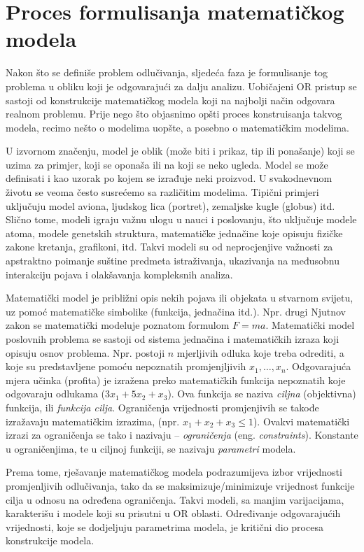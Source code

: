 \documentclass[b5paper, utf8, 11pt, colorlinks]{book}
\theoremstyle{definition}
\begin{document}
 \section{Proces formulisanja matematičkog modela}

 Nakon što se definiše problem odlučivanja, sljedeća faza je formulisanje tog problema u obliku koji je odgovarajući za dalju analizu. Uobičajeni OR pristup se sastoji od konstrukcije matematičkog modela koji na najbolji način odgovara realnom problemu. Prije nego što objasnimo opšti proces konstruisanja takvog modela, recimo nešto o modelima uopšte, a posebno o matematičkim modelima.

  U izvornom značenju, 
 model je oblik (može biti i prikaz, tip ili ponašanje) koji se uzima za primjer, koji se oponaša ili na koji se neko ugleda.  Model se može definisati i kao uzorak po kojem se izrađuje neki proizvod. U svakodnevnom životu se veoma često susrećemo sa različitim modelima.  Tipični primjeri uključuju model aviona, ljudskog lica (portret), zemaljske kugle (globus) itd. Slično tome, modeli igraju
 važnu ulogu u nauci i poslovanju, što uključuje modele atoma, modele 
 genetskih struktura, matematičke jednačine koje opisuju fizičke zakone kretanja, grafikoni, itd. Takvi modeli
 su od neprocjenjive važnosti za apstraktno poimanje suštine predmeta istraživanja, ukazivanja na međusobnu interakciju pojava i olakšavanja kompleksnih analiza. 

 Matematički model je približni opis nekih pojava ili objekata u stvarnom svijetu, uz pomoć matematičke simbolike (funkcija, jednačina itd.). Npr. drugi Njutnov zakon se matematički modeluje poznatom formulom $F=ma$. Matematički model poslovnih problema   
 se sastoji od sistema jednačina i matematičkih izraza koji opisuju osnov problema. Npr. postoji $n$ mjerljivih odluka koje treba odrediti, a koje su predstavljene pomoću nepoznatih promjenjljivih $x_1,\ldots, x_n$.  Odgovarajuća mjera učinka (profita) je izražena preko matematičkih funkcija nepoznatih koje odgovaraju  odlukama ($3x_1 + 5x_2 + x_3$). Ova funkcija se naziva \emph{ciljna} (objektivna) funkcija, ili \emph{funkcija cilja}. Ograničenja  vrijednosti promjenjivih se takođe izražavaju matematičkim izrazima, (npr. $x_1 + x_2 + x_3 \leq 1$).  Ovakvi matematički izrazi za ograničenja se tako i nazivaju -- \emph{ograničenja} (eng. \emph{constraints}). Konstante u ograničenjima, te u ciljnoj funkciji, se nazivaju \emph{parametri} modela.

 Prema tome, rješavanje matematičkog modela 
 podrazumijeva izbor vrijednosti promjenljivih odlučivanja, tako da se maksimizuje/minimizuje vrijednost funkcije cilja u odnosu na određena ograničenja. Takvi modeli, sa manjim varijacijama, karakterišu i modele koji su prisutni u OR oblasti. 
 Određivanje odgovarajućih vrijednosti, koje se dodjeljuju parametrima modela, je kritični dio procesa konstrukcije modela.
\end{document}
